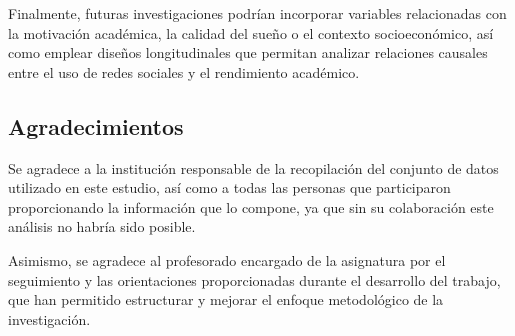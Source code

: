 \documentclass[12pt]{article}
\begin{document}
Finalmente, futuras investigaciones podrían incorporar variables relacionadas con la motivación académica, la calidad del sueño o el contexto socioeconómico, así como emplear diseños longitudinales que permitan analizar relaciones causales entre el uso de redes sociales y el rendimiento académico.

\subsection*{Agradecimientos}

Se agradece a la institución responsable de la recopilación del conjunto de datos utilizado en este estudio, así como a todas las personas que participaron proporcionando la información que lo compone, ya que sin su colaboración este análisis no habría sido posible.

Asimismo, se agradece al profesorado encargado de la asignatura por el seguimiento y las orientaciones proporcionadas durante el desarrollo del trabajo, que han permitido estructurar y mejorar el enfoque metodológico de la investigación.




\end{document}
